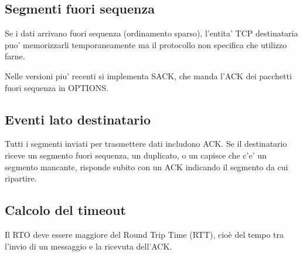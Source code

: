 \subsection{Segmenti fuori sequenza}
Se i dati arrivano fuori sequenza (ordinamento sparso), l'entita' TCP destinataria puo' memorizzarli temporaneamente ma il protocollo non specifica che utilizzo farne.

Nelle versioni piu' recenti si implementa SACK, che manda l'ACK dei pacchetti fuori sequenza in OPTIONS.
\subsection{Eventi lato destinatario}
Tutti i segmenti inviati per trasmettere dati includono ACK.
Se il destinatario riceve un segmento fuori sequenza, un duplicato, o un capisce che c'e' un segmento mancante, risponde subito con un ACK indicando il segmento da cui ripartire.
\subsection{Calcolo del timeout}
Il RTO deve essere maggiore del Round Trip Time (RTT), cioè del tempo tra l'invio di un messaggio e la ricevuta dell'ACK.

